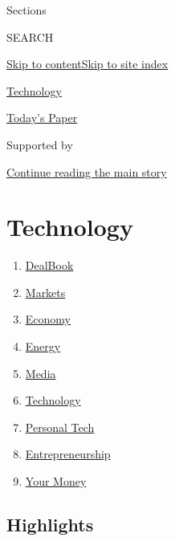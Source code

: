 Sections

SEARCH

\protect\hyperlink{site-content}{Skip to
content}\protect\hyperlink{site-index}{Skip to site index}

\href{https://www.nytimes3xbfgragh.onion/section/technology}{Technology}

\href{https://myaccount.nytimes3xbfgragh.onion/auth/login?response_type=cookie\&client_id=vi}{}

\href{https://www.nytimes3xbfgragh.onion/section/todayspaper}{Today's
Paper}

Supported by

\protect\hyperlink{after-sponsor}{Continue reading the main story}

\hypertarget{technology}{%
\section{Technology}\label{technology}}

\begin{enumerate}
\def\labelenumi{\arabic{enumi}.}
\tightlist
\item
  \href{/pages/business/dealbook/index.html}{DealBook}
\item
  \href{https://markets.on.nytimes3xbfgragh.onion}{Markets}
\item
  \href{/section/business/economy}{Economy}
\item
  \href{/section/business/energy-environment}{Energy}
\item
  \href{/section/business/media}{Media}
\item
  \href{/section/technology}{Technology}
\item
  \href{/section/technology/personaltech}{Personal Tech}
\item
  \href{/section/business/smallbusiness}{Entrepreneurship}
\item
  \href{/section/your-money}{Your Money}
\end{enumerate}

\hypertarget{highlights}{%
\subsection{Highlights}\label{highlights}}

